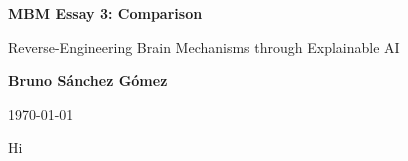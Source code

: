 \documentclass[11pt,a4paper]{article}
\author{Bruno Sánchez Gómez}
\date{\today}
\begin{document}
\begin{titlepage}
    \centering
    \vspace*{2cm}
    {\Huge \bfseries MBM Essay 3: Comparison \par}
    \vspace{2cm}
    {\Large {\Huge Reverse-Engineering Brain Mechanisms through Explainable AI} \par}
    \vspace{8cm}
    {\large \textbf{Bruno Sánchez Gómez} \par}
    \vfill
    {\large \today \par}
\end{titlepage}

Hi

\clearpage
\nocite{*}
\printbibliography%
\end{document}
